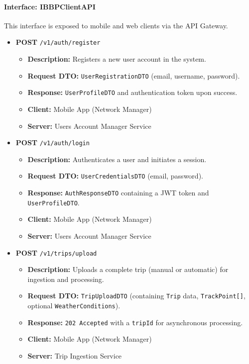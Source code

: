 \paragraph{Interface: IBBPClientAPI}
This interface is exposed to mobile and web clients via the API Gateway.
\begin{itemize}
    \item \textbf{POST} \texttt{/v1/auth/register}
    \begin{itemize}
        \item \textbf{Description:} Registers a new user account in the system.
        \item \textbf{Request DTO:} \texttt{UserRegistrationDTO} (email, username, password).
        \item \textbf{Response:} \texttt{UserProfileDTO} and authentication token upon success.
        \item \textbf{Client:} Mobile App (Network Manager)
        \item \textbf{Server:} Users Account Manager Service
    \end{itemize}
    
    \item \textbf{POST} \texttt{/v1/auth/login}
    \begin{itemize}
        \item \textbf{Description:} Authenticates a user and initiates a session.
        \item \textbf{Request DTO:} \texttt{UserCredentialsDTO} (email, password).
        \item \textbf{Response:} \texttt{AuthResponseDTO} containing a JWT token and \texttt{UserProfileDTO}.
        \item \textbf{Client:} Mobile App (Network Manager)
        \item \textbf{Server:} Users Account Manager Service
    \end{itemize}
    
    \item \textbf{POST} \texttt{/v1/trips/upload}
    \begin{itemize}
        \item \textbf{Description:} Uploads a complete trip (manual or automatic) for ingestion and processing.
        \item \textbf{Request DTO:} \texttt{TripUploadDTO} (containing \texttt{Trip} data, \texttt{TrackPoint[]}, optional \texttt{WeatherConditions}).
        \item \textbf{Response:} \texttt{202 Accepted} with a \texttt{tripId} for asynchronous processing.
        \item \textbf{Client:} Mobile App (Network Manager)
        \item \textbf{Server:} Trip Ingestion Service
    \end{itemize}
    

\end{itemize}
